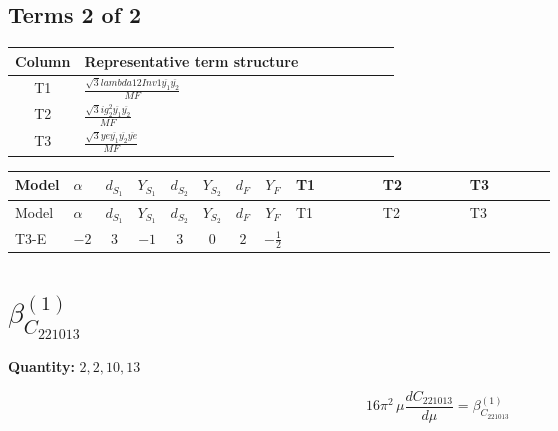 \documentclass[8pt]{article}
\begin{document}
\begin{landscape}
\subsection*{Terms 2 of 2}
\begin{center}
\begin{tabular}{@{}c >{\raggedright\arraybackslash}p{0.82\linewidth}@{}}
\toprule
Column & Representative term structure \\
\midrule
T1 & \(\displaystyle \frac{\sqrt{3} lambda12Inv1 \overline{y_{1}} \overline{y_{2}}}{MF}\) \\
\midrule
T2 & \(\displaystyle \frac{\sqrt{3} i g_{2}^{2} \overline{y_{1}} \overline{y_{2}}}{MF}\) \\
\midrule
T3 & \(\displaystyle \frac{\sqrt{3} ye \overline{y_{1}} \overline{y_{2}} \overline{ye}}{MF}\) \\
\midrule
\bottomrule
\end{tabular}
\end{center}
\smallskip
\tiny
\begin{longtable}{@{}llcccccc >{\raggedright\arraybackslash}p{0.21\linewidth} >{\raggedright\arraybackslash}p{0.21\linewidth} >{\raggedright\arraybackslash}p{0.21\linewidth}@{}}
\toprule
Model & $\alpha$ & $d_{S_1}$ & $Y_{S_1}$ & $d_{S_2}$ & $Y_{S_2}$ & $d_F$ & $Y_F$ & T1 & T2 & T3 \\
\midrule
\endfirsthead
\toprule
Model & $\alpha$ & $d_{S_1}$ & $Y_{S_1}$ & $d_{S_2}$ & $Y_{S_2}$ & $d_F$ & $Y_F$ & T1 & T2 & T3 \\
\midrule
\endhead
T3-E & $-2$ & $3$ & $-1$ & $3$ & $0$ & $2$ & $-\frac{1}{2}$ & \scriptsize\adjustbox{max width=\linewidth}{$\begin{gathered} \frac{\sqrt{3} lambda12Inv1 \overline{y_{1}} \overline{y_{2}}}{6 MF}\end{gathered}$} & \scriptsize\adjustbox{max width=\linewidth}{$\begin{gathered} - \frac{\sqrt{3} i g_{2}^{2} \overline{y_{1}} \overline{y_{2}}}{6 MF}\end{gathered}$} & \scriptsize\adjustbox{max width=\linewidth}{$\begin{gathered} \frac{\sqrt{3} ye \overline{y_{1}} \overline{y_{2}} \overline{ye}}{12 MF}\end{gathered}$} \\
\midrule
\bottomrule
\end{longtable}
\clearpage
\section*{$\beta_{C_{221013}}^{(1)}$}
\noindent\textbf{Quantity: }$\mathrm{2,2,10,13}$\par\smallskip
\[16\pi^2\,\mu\frac{d C_{221013}}{d\mu}=\beta_{C_{221013}}^{(1)}\]

\end{landscape}
\end{document}
